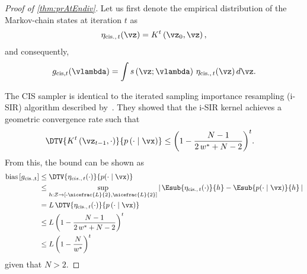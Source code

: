 \prAtEndRestateiv*
\label{proofsection:prAtEndiv}\begin{proof}[Proof of \autoref{thm:prAtEndiv}]\label{proof:prAtEndiv}Let us first denote the empirical distribution of the Markov-chain states at iteration \(t\) as \begin {align} \eta _{\mathrm {cis.},\, t}(\vz ) = K^{t}\left (\vz _0, \vz \right ), \end {align} and consequently, \begin {align} g_{\mathrm {cis}, t}(\vlambda ) = \int s\left (\vz ; \vlambda \right ) \, \eta _{\mathrm {cis.},\, t}(\vz ) \, d\vz . \end {align} \par The CIS sampler is identical to the iterated sampling importance resampling (i-SIR) algorithm described by~\citet {andrieu_uniform_2018}. They showed that the i-SIR kernel achieves a geometric convergence rate such that \begin {align} \DTV {K^{t}\left (\vz _{t-1},\cdot \right )}{p\left (\cdot \mid \vx \right )} &\leq {\left (1 - \frac {N - 1}{2\,w^* + N - 2}\right )}^t. \end {align} From this, the bound can be shown as \begin {align} \mathrm {bias}\left [ g_{\mathrm {cis., t}} \right ] &\leq \DTV {\eta _{cis.,\, t}(\cdot )}{p(\cdot \mid \vx )} \\ &\leq \sup _{h : \mathcal {Z} \rightarrow \left [ \text {-}\nicefrac {L}{2}, \nicefrac {L}{2} \right ]} \left |\, \Esub {\eta _{\mathrm {cis.},\, t}(\cdot )}{h} - \Esub {p(\cdot \mid \vx )}{h} \,\right | \\ &= L \, \DTV { \eta _{\mathrm {cis.},\, t}(\cdot ) }{p\left (\cdot \mid \vx \right )} \\ &\leq L \, {\left (1 - \frac {N - 1}{2\,w^* + N - 2}\right )}^t \\ &\leq L \, {\left (1 - \frac {N}{w^*}\right )}^t \\ \end {align} given that \(N > 2\).\end{proof}
\prAtEndRestatev*
